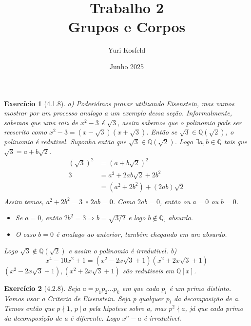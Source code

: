 \documentclass{article}
\title{Trabalho 2 \\ \large Grupos e Corpos}
\author{Yuri Kosfeld}
\date{Junho 2025}
\newtheorem*{ex}{Exercício}
\begin{document}
\maketitle

\begin{ex}[4.1.8]
    a) Poderiámos provar utilizando Eisenstein, mas vamos mostrar por um processo analogo a um exemplo dessa seção.
    Informalmente, sabemos que uma raiz de $x^2 -3$ é $\sqrt{3}$, assim sabemos que o polinomio pode ser reescrito como 
    $x^2 -3 = (x - \sqrt{3})(x + \sqrt{3})$. Então se $\sqrt{3} \in \mathbb{Q}(\sqrt{2})$, o polinomio é redutivel.
    Suponha então que $\sqrt{3} \in \mathbb{Q}(\sqrt{2})$. Logo $\exists a, b \in \mathbb{Q}$ tais que $\sqrt{3} = a + b\sqrt{2}$.
    \begin{align*}
        (\sqrt{3})^2 &= (a + b\sqrt{2})^2 \\
        3 &= a^2 + 2ab\sqrt{2} + 2b^2 \\
        &= (a^2 + 2b^2) + (2ab)\sqrt{2}\\
    \end{align*}
    Assim temos, $a^2 + 2b^2 = 3$ e $2ab = 0$.
    Como $2ab = 0$, então ou $a = 0$ ou $b = 0$.
    \begin{itemize}
        \item Se $a = 0$, então $2b^2 = 3 \Rightarrow b = \sqrt{3/2}$ e logo $b \notin \mathbb{Q}$, absurdo.
        \item O caso $b = 0$ é analago ao anterior, também chegando em um absurdo. 
    \end{itemize}
    Logo $\sqrt{3} \notin \mathbb{Q}(\sqrt{2})$ e assim o polinomio é irredutivel.
    b) \[x^4 -10x^2 + 1 = (x^2 -2x\sqrt{3} + 1)(x^2 +2x\sqrt{3} + 1)\]
    $(x^2 -2x\sqrt{3} + 1), (x^2 +2x\sqrt{3} + 1)$ são redutiveis em $\mathbb{Q} [x]$.
\end{ex}

\begin{ex}[4.2.8]
    Seja $a = p_1 p_2 \dots p_k$ em que cada $p_i$ é um primo distinto.
    Vamos usar o Criterio de Eisenstein. 
    Seja p qualquer $p_i$ da decomposição de a.
    Temos então que $p \nmid 1$, $p \ | \ a$ pela hipotese sobre a, mas $p^2 \nmid a$, já que cada primo da decomposição de a é diferente.
    Logo $x^n - a$ é irredutivel.
\end{ex}
\end{document}
